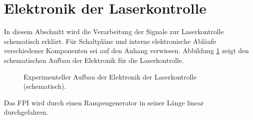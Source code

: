 \section{Elektronik der Laserkontrolle}\label{sec:elektronik_laserkontrolle} In
diesem Abschnitt wird die Verarbeitung der Signale zur Laserkontrolle schematisch erklärt. Für
Schaltpläne und interne elektronische Abläufe verschiedener Komponenten sei auf
den Anhang verwiesen. Abbildung \ref{fig:experimenteller_aufbau_elektronik_laserkontrolle} zeigt den
schematischen Aufbau der Elektronik für die Laserkontrolle.\par
\begin{figure}[h]
 	\centering
	\caption[Experimenteller Aufbau der Laserkontollelektronik,
	schematisch]{Experimenteller Aufbau der Elektronik der Laserkontrolle
	(schematisch).}\label{fig:experimenteller_aufbau_elektronik_laserkontrolle}
\end{figure}
Das FPI wird durch einen Rampengenerator in seiner Länge linear durchgefahren.
